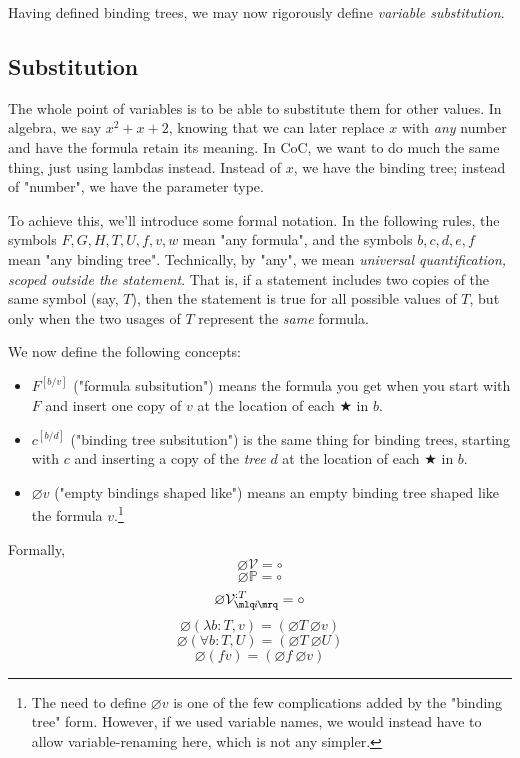 \documentclass{article}
\newcommand{\Prop}{\mathbb{P}}
\newcommand{\usage}{\mathcal{V}}
\newcommand{\usageKnown}[2]{{\usage_{\mlq\hspace{-0.06em}#2\hspace{-0.06em}\mrq}^{:#1}}}
\newcommand{\subst}[3]{#1^{[{#2}{/}{#3}]}}
\newcommand{\bindvariable}{\bigstar}
\newcommand{\bindnotthis}{\circ}
\newcommand{\emptybindingslike}[1]{\varnothing #1}
\begin{document}
  Having defined binding trees, we may now rigorously define \emph{variable substitution}.
  
  
  
  \subsection{Substitution}
  
  The whole point of variables is to be able to substitute them for other values. In algebra, we say $x^2 + x + 2$, knowing that we can later replace $x$ with \emph{any} number and have the formula retain its meaning. In CoC, we want to do much the same thing, just using lambdas instead. Instead of $x$, we have the binding tree; instead of "number", we have the parameter type.
  
  To achieve this, we'll introduce some formal notation. In the following rules, the symbols $F,G,H,T,U,f,v,w$ mean "any formula", and the symbols $b,c,d,e,f$ mean "any binding tree". Technically, by "any", we mean \emph{universal quantification, scoped outside the statement}. That is, if a statement includes two copies of the same symbol (say, $T$), then the statement is true for all possible values of $T$, but only when the two usages of $T$ represent the \emph{same} formula.
  
  We now define the following concepts:
  
  \begin{itemize}
  \item $\subst{F}{b}{v}$ ("formula subsitution") means the formula you get when you start with $F$ and insert one copy of $v$ at the location of each $\bindvariable$ in $b$.
  \item $\subst{c}{b}{d}$ ("binding tree subsitution") is the same thing for binding trees, starting with $c$ and inserting a copy of the \emph{tree} $d$ at the location of each $\bindvariable$ in $b$.
  \item $\emptybindingslike{v}$ ("empty bindings shaped like") means an empty binding tree shaped like the formula $v$.\footnote{The need to define $\emptybindingslike{v}$ is one of the few complications added by the "binding tree" form. However, if we used variable names, we would instead have to allow variable-renaming here, which is not any simpler.}
  \end{itemize}
  
  
  
  Formally,  
  \[\emptybindingslike{\usage} = \bindnotthis\]
  \[\emptybindingslike{\Prop} = \bindnotthis\]
  \[\emptybindingslike{\usageKnown{T}{i}} = \bindnotthis\]
  \[\emptybindingslike{(\lambda b:T,v)} = (\emptybindingslike{T}\ \emptybindingslike{v})\]
  \[\emptybindingslike{(\forall b:T,U)} = (\emptybindingslike{T}\ \emptybindingslike{U})\]
  \[\emptybindingslike{(f v)} = (\emptybindingslike{f}\ \emptybindingslike{v})\]
    
\end{document}
